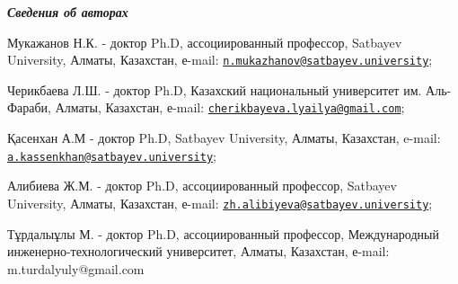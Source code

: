 \emph{{\bfseries Сведения об авторах}}

Мукажанов Н.К. - доктор Ph.D, ассоциированный профессор, Satbayev
University, Алматы, Казахстан, е-mail:
\href{mailto:n.mukazhanov@satbayev.university}{\nolinkurl{n.mukazhanov@satbayev.university}};

Черикбаева Л.Ш. - доктор Ph.D, Казахский национальный университет им.
Аль-Фараби, Алматы, Казахстан, е-mail:
\href{mailto:cherikbayeva.lyailya@gmail.com}{\nolinkurl{cherikbayeva.lyailya@gmail.com}};

Қасенхан А.М - доктор Ph.D, Satbayev University, Алматы, Казахстан,
e-mail:
\href{mailto:a.kassenkhan@satbayev.university}{\nolinkurl{a.kassenkhan@satbayev.university}};

Алибиева Ж.М. - доктор Ph.D, ассоциированный профессор, Satbayev
University, Алматы, Казахстан, е-mail:
\href{mailto:zh.alibiyeva@satbayev.university}{\nolinkurl{zh.alibiyeva@satbayev.university}};

Тұрдалыұлы М. - доктор Ph.D, ассоциированный профессор, Международный
инженерно-технологический университет, Алматы, Казахстан, е-mail:
m.turdalyuly@gmail.com
